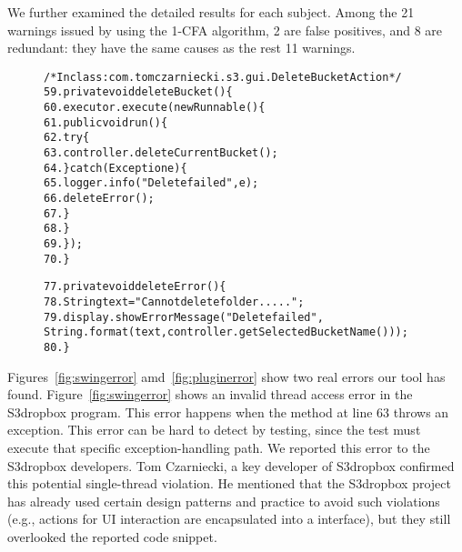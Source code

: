 We further examined the detailed results for each subject.
Among the 21 warnings issued by using the 1-CFA algorithm, 2
are false positives, and 8 are redundant:
they have the same causes as the rest 11 warnings. 




\begin{figure}[t]
\begin{CodeOut}
\begin{alltt}
/* In class: com.tomczarniecki.s3.gui.DeleteBucketAction */
59.private void deleteBucket() \{
60.    executor.execute(new Runnable() \{
61.        public void run() \{
62.            try \{
63.                controller.deleteCurrentBucket();
64.            \} catch (Exception e) \{
65.                logger.info("Delete failed", e);
66.                deleteError(); 
67.            \}
68.       \}
69.    \});
70.\}

77.private void deleteError() \{
78.    String text = "Cannot delete folder .....";
79.    display.showErrorMessage("Delete failed", 
        String.format(text, controller.getSelectedBucketName())); 
80.\}
\end{alltt}
\end{CodeOut}
\vspace*{-2.0ex}  %
\end{figure}

Figures~\ref{fig:swingerror} amd~\ref{fig:pluginerror} show
two real errors our tool has found. Figure~\ref{fig:swingerror}
shows an invalid thread access error in the S3dropbox
program. This error happens when the 
method at line 63 throws an exception. This error can be hard to
detect by testing, since the test must  execute that specific exception-handling
path. We reported this error to the S3dropbox developers. Tom Czarniecki,
a key developer of S3dropbox confirmed this potential single-thread
violation. He mentioned that the S3dropbox project has already
used certain design patterns and practice to avoid such violations (e.g.,
actions for UI interaction are encapsulated into a  interface),
but they still overlooked  the reported code snippet. 

